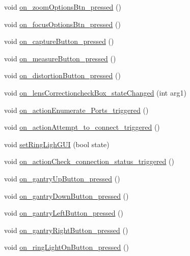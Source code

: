 \begin{DoxyCompactItemize}
\item 
void \mbox{\hyperlink{class_main_window_aaf176f5c10001cdcf845f1250232be9a}{on\+\_\+zoom\+Options\+Btn\+\_\+pressed}} ()
\item 
void \mbox{\hyperlink{class_main_window_ac3ebf4a093bf8190311ec0c146ea3bbc}{on\+\_\+focus\+Options\+Btn\+\_\+pressed}} ()
\item 
void \mbox{\hyperlink{class_main_window_a2a1fcefe2bf1f110eb2c589ac57b07d7}{on\+\_\+capture\+Button\+\_\+pressed}} ()
\item 
void \mbox{\hyperlink{class_main_window_aa9bd65042eb23d5fa3f548da285067a6}{on\+\_\+measure\+Button\+\_\+pressed}} ()
\item 
void \mbox{\hyperlink{class_main_window_ab98ee5c1e01d4db75d27e3f00c7c4b78}{on\+\_\+distortion\+Button\+\_\+pressed}} ()
\item 
void \mbox{\hyperlink{class_main_window_a67e14c051d3926ca57a97c271dcf7013}{on\+\_\+lens\+Correctioncheck\+Box\+\_\+state\+Changed}} (int arg1)
\item 
void \mbox{\hyperlink{class_main_window_a46438ceaa867139cda643f2704fc7f55}{on\+\_\+action\+Enumerate\+\_\+\+Ports\+\_\+triggered}} ()
\item 
void \mbox{\hyperlink{class_main_window_aea8024d64cc8d8b805b66a45524e753e}{on\+\_\+action\+Attempt\+\_\+to\+\_\+connect\+\_\+triggered}} ()
\item 
void \mbox{\hyperlink{class_main_window_a64190d66464e087f1df9ba7541ae52ff}{set\+Ring\+Ligh\+G\+UI}} (bool state)
\item 
void \mbox{\hyperlink{class_main_window_aa6925b9f63240473ebb0baeb0caf51d5}{on\+\_\+action\+Check\+\_\+connection\+\_\+status\+\_\+triggered}} ()
\item 
void \mbox{\hyperlink{class_main_window_a6977641f537b731bb9ede0c341388fb1}{on\+\_\+gantry\+Up\+Button\+\_\+pressed}} ()
\item 
void \mbox{\hyperlink{class_main_window_a04c1e4428230f33e991ff87aed62575f}{on\+\_\+gantry\+Down\+Button\+\_\+pressed}} ()
\item 
void \mbox{\hyperlink{class_main_window_a116f8869b68f5d57afe1849fd1f0f0f7}{on\+\_\+gantry\+Left\+Button\+\_\+pressed}} ()
\item 
void \mbox{\hyperlink{class_main_window_a2456f40cbc5747391f01b61c59edd6dd}{on\+\_\+gantry\+Right\+Button\+\_\+pressed}} ()
\item 
void \mbox{\hyperlink{class_main_window_ac7c8a9d8f85ea41b9017fb13c95c3e79}{on\+\_\+ring\+Light\+On\+Button\+\_\+pressed}} ()
\item 

\end{DoxyCompactItemize}
